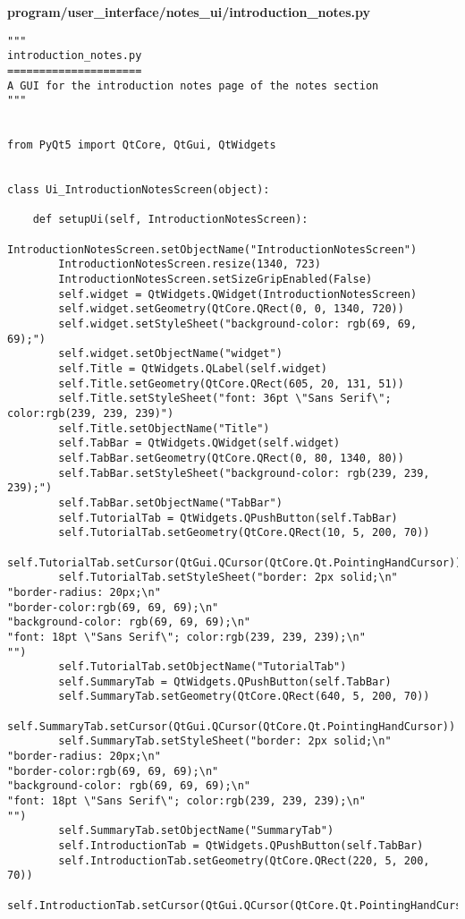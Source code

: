 \documentclass{article}
\begin{document}
\textbf{program/user\_interface/notes\_ui/introduction\_notes.py}

\begin{lstlisting}
"""
introduction_notes.py
=====================
A GUI for the introduction notes page of the notes section
"""


from PyQt5 import QtCore, QtGui, QtWidgets


class Ui_IntroductionNotesScreen(object):

    def setupUi(self, IntroductionNotesScreen):
        IntroductionNotesScreen.setObjectName("IntroductionNotesScreen")
        IntroductionNotesScreen.resize(1340, 723)
        IntroductionNotesScreen.setSizeGripEnabled(False)
        self.widget = QtWidgets.QWidget(IntroductionNotesScreen)
        self.widget.setGeometry(QtCore.QRect(0, 0, 1340, 720))
        self.widget.setStyleSheet("background-color: rgb(69, 69, 69);")
        self.widget.setObjectName("widget")
        self.Title = QtWidgets.QLabel(self.widget)
        self.Title.setGeometry(QtCore.QRect(605, 20, 131, 51))
        self.Title.setStyleSheet("font: 36pt \"Sans Serif\"; color:rgb(239, 239, 239)")
        self.Title.setObjectName("Title")
        self.TabBar = QtWidgets.QWidget(self.widget)
        self.TabBar.setGeometry(QtCore.QRect(0, 80, 1340, 80))
        self.TabBar.setStyleSheet("background-color: rgb(239, 239, 239);")
        self.TabBar.setObjectName("TabBar")
        self.TutorialTab = QtWidgets.QPushButton(self.TabBar)
        self.TutorialTab.setGeometry(QtCore.QRect(10, 5, 200, 70))
        self.TutorialTab.setCursor(QtGui.QCursor(QtCore.Qt.PointingHandCursor))
        self.TutorialTab.setStyleSheet("border: 2px solid;\n"
"border-radius: 20px;\n"
"border-color:rgb(69, 69, 69);\n"
"background-color: rgb(69, 69, 69);\n"
"font: 18pt \"Sans Serif\"; color:rgb(239, 239, 239);\n"
"")
        self.TutorialTab.setObjectName("TutorialTab")
        self.SummaryTab = QtWidgets.QPushButton(self.TabBar)
        self.SummaryTab.setGeometry(QtCore.QRect(640, 5, 200, 70))
        self.SummaryTab.setCursor(QtGui.QCursor(QtCore.Qt.PointingHandCursor))
        self.SummaryTab.setStyleSheet("border: 2px solid;\n"
"border-radius: 20px;\n"
"border-color:rgb(69, 69, 69);\n"
"background-color: rgb(69, 69, 69);\n"
"font: 18pt \"Sans Serif\"; color:rgb(239, 239, 239);\n"
"")
        self.SummaryTab.setObjectName("SummaryTab")
        self.IntroductionTab = QtWidgets.QPushButton(self.TabBar)
        self.IntroductionTab.setGeometry(QtCore.QRect(220, 5, 200, 70))
        self.IntroductionTab.setCursor(QtGui.QCursor(QtCore.Qt.PointingHandCursor))

\end{lstlisting}
\end{document}
